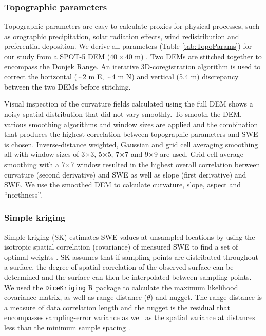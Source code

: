 \documentclass[review,oneside, letterpaper]{igs}
\begin{document}
\subsubsection{Topographic parameters}

Topographic parameters are easy to calculate proxies for physical processes, such as orographic precipitation, solar radiation effects, wind redistribution and preferential deposition. We derive all parameters (Table \ref{tab:TopoParams}) for our study from a SPOT-5 DEM ($40\times40$ m) \citep{Korona2009}. Two DEMs are stitched together to encompass the Donjek Range. An iterative 3D-coregistration algorithm \citep{Berthier2007} is used to correct the horizontal ($\sim$2 m E, $\sim$4 m N) and vertical (5.4 m) discrepancy between the two DEMs before stitching. 

Visual inspection of the curvature fields calculated using the full DEM shows a noisy spatial distribution that did not vary smoothly. To smooth the DEM, various smoothing algorithms and window sizes are applied and the combination that produces the highest correlation between topographic parameters and SWE is chosen. Inverse-distance weighted, Gaussian and grid cell averaging smoothing all with window sizes of 3$\times$3, 5$\times$5, 7$\times$7 and 9$\times$9 are used. Grid cell average smoothing with a 7$\times$7 window resulted in the highest overall correlation between curvature (second derivative) and SWE as well as slope (first derivative) and SWE. We use the smoothed DEM to calculate curvature, slope, aspect and ``northness''.

\subsubsection{Simple kriging}

Simple kriging (SK) estimates SWE values at unsampled locations by using the isotropic spatial correlation (covariance) of measured SWE to find a set of optimal weights \citep{Davis1986, Li2008}. SK assumes that if sampling points are distributed throughout a surface, the degree of spatial correlation of the observed surface can be determined and the surface can then be interpolated between sampling points. We used the \texttt{DiceKriging} R package \citep{Roustant2012} to calculate the maximum likelihood covariance matrix, as well as range distance ($\theta$) and nugget. The range distance is a measure of data correlation length and the nugget is the residual that encompasses sampling-error variance as well as the spatial variance at distances less than the minimum sample spacing \citep{Li2008}. 
\end{document}
